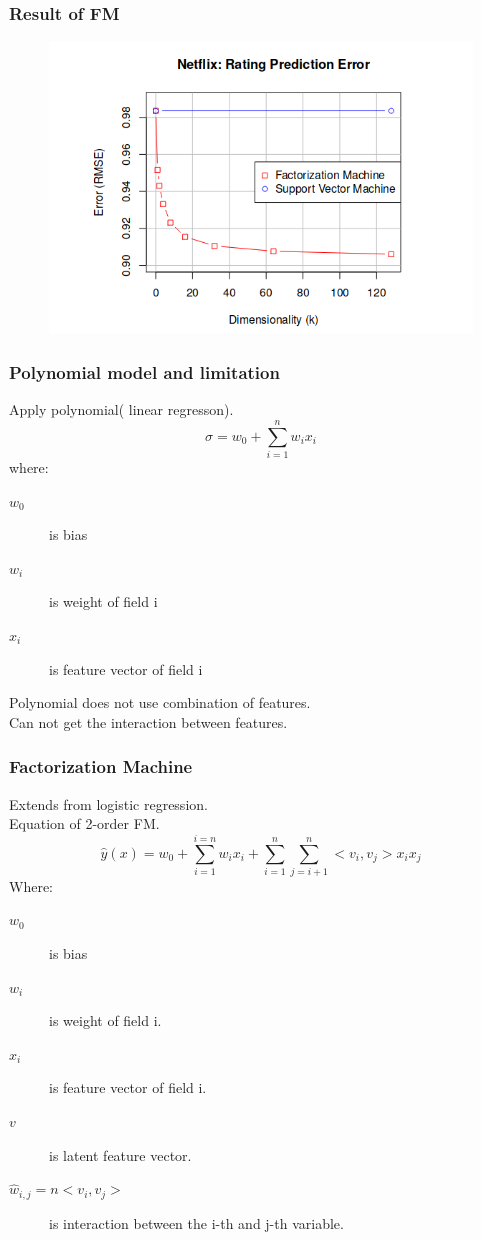 \documentclass{beamer}
\begin{document}
\begin{frame}
	\frametitle{Result of FM}
	\begin{figure}
		\includegraphics[scale=0.5]{fm_result}
	\end{figure}
\end{frame}

\begin{frame}
	\frametitle{Polynomial model and limitation}
	Apply polynomial( linear regresson).
	\begin{equation}
		\sigma = w_{0} + \sum_{i=1}^{n} w_{i} x_{i} 
	\end{equation}
	where:
	\begin{description}
		\item[$w_0$] is bias
		\item[$w_i$] is weight of field i
		\item[$x_i$] is feature vector of field i 	
	\end{description}	
	Polynomial does not use combination of features. \\
	Can not get the interaction between features.
\end{frame}

\begin{frame}
	\frametitle{Factorization Machine}
	Extends from logistic regression. \\
	Equation of 2-order FM. \\
	\[
	\hat{y}(x) = w_{0} + \sum_{i=1}^{i=n} w_{i} x_{i} + \sum_{i=1}^n \sum_{j=i+1}^n<v_i, v_j>x_i x_j
	\]
	Where: 
	\begin{description}
		\item[$w_0$] is bias
		\item[$w_i$] is weight of field i.
		\item[$x_i$] is feature vector of field i. 
		\item[$v$] is latent feature vector.
		\item[$\hat{w}_{i,j} =n<v_i, v_j>$] is interaction between the i-th and j-th variable.
	\end{description}
\end{frame}
\end{document}
